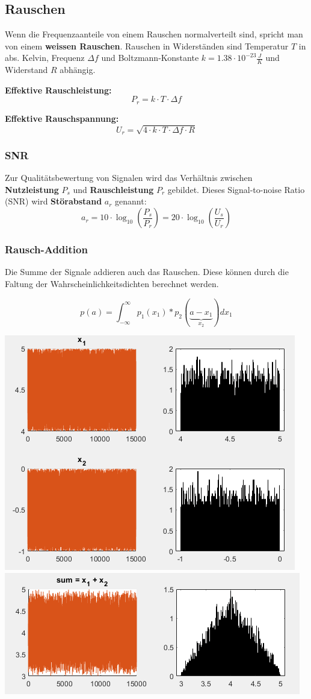 \subsection{Rauschen}
Wenn die Frequenzaanteile von einem Rauschen normalverteilt sind, spricht man von einem \textbf{weissen Rauschen}. 
Rauschen in Widerständen sind Temperatur $T$ in abs. Kelvin, Frequenz $\Delta f$ und Boltzmann-Konstante $k = 1.38\cdot10^{-23}\frac{J}{K}$ und Widerstand $R$ abhängig.

\noindent \textbf{Effektive Rauschleistung:}
\[
P_r = k\cdot T\cdot \Delta f
\]

\noindent \textbf{Effektive Rauschspannung:}
\[
U_r = \sqrt{4\cdot k\cdot T\cdot \Delta f \cdot R}
\]

\subsubsection{SNR}
Zur Qualitätsbewertung von Signalen wird das Verhältnis zwischen \textbf{Nutzleistung} $P_s$ und \textbf{Rauschleistung} $P_r$ gebildet. Dieses Signal-to-noise Ratio (SNR) wird \textbf{Störabstand} $a_r$ genannt:
\[
a_r = 10\cdot \log_{10}\left(\frac{P_s}{P_r}\right) = 20\cdot \log_{10}\left(\frac{U_s}{U_r}\right)
\]

\subsubsection{Rausch-Addition}
Die Summe der Signale addieren auch das Rauschen. Diese können durch die Faltung der Wahrscheinlichkeitsdichten berechnet werden.

\[
p(a) = \int_{-\infty}^{\infty}p_1(x_1)*p_2(\underbrace{a - x_1}_{x_2})dx_1
\]

\begin{center}
	\noindent \includegraphics[width=0.7\columnwidth]{Images/rauschen_example1}
\noindent \includegraphics[width=0.7\columnwidth]{Images/rauschen_example2}
\end{center}


